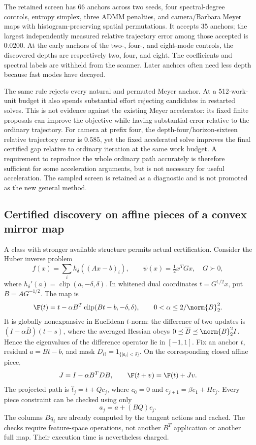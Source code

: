 The retained screen has 66 anchors across two seeds, four spectral-degree
controls, entropy simplex, three ADMM penalties, and camera/Barbara Meyer
maps with histogram-preserving spatial permutations. It accepts 35 anchors;
the largest independently measured relative trajectory error among those
accepted is $0.0200$. At the early anchors of the two-, four-, and eight-mode
controls, the discovered depths are respectively two, four, and eight.
The coefficients and spectral labels are withheld from the scanner.
Later anchors often need less depth because fast modes have decayed.

The same rule rejects every natural and permuted Meyer anchor. At a
512-work-unit budget it also spends substantial effort rejecting candidates
in restarted solves. This is not evidence against the existing Meyer
accelerator: its fixed finite proposals can improve the objective while
having substantial error relative to the ordinary trajectory. For camera
at prefix four, the depth-four/horizon-sixteen relative trajectory error is
$0.585$, yet the fixed accelerated solve improves the final certified gap
relative to ordinary iteration at the same work budget. A requirement to
reproduce the whole ordinary path accurately is therefore sufficient for
some acceleration arguments, but is not necessary for useful acceleration.
The sampled screen is retained as a diagnostic and is not promoted as the
new general method.

\subsection{Certified discovery on affine pieces of a convex mirror map}
A class with stronger available structure permits actual certification.
Consider the Huber inverse problem
\[
 f(x)=\sum_i h_\delta((Ax-b)_i),\qquad
 \psi(x)=\tfrac12 x^TGx,\quad G\succ0,
\]
where $h_\delta'(a)=\operatorname{clip}(a,-\delta,\delta)$.
In whitened dual coordinates $t=G^{1/2}x$, put $B=AG^{-1/2}$. The map is
\begin{equation}
 \F(t)=t-\alpha B^T\operatorname{clip}(Bt-b,-\delta,\delta),
 \qquad 0<\alpha\leq 2/\norm{B}_2^2. \label{eq:huber}
\end{equation}
It is globally nonexpansive in Euclidean $t$-norm: the difference of two
updates is $(I-\alpha\overline B)(t-s)$, where the averaged Hessian obeys
$0\preceq\overline B\preceq\norm{B}_2^2 I$. Hence the eigenvalues of the
difference operator lie in $[-1,1]$. Fix an anchor $t$, residual $a=Bt-b$, and mask
$D_{ii}=1_{\{|a_i|<\delta\}}$. On the corresponding closed affine piece,
\[
 J=I-\alpha B^TDB,\qquad
 \F(t+v)=\F(t)+Jv.
\]
The projected path is $\widehat t_j=t+Qc_j$, where
$c_0=0$ and $c_{j+1}=\beta e_1+Hc_j$.
Every piece constraint can be checked using only
\begin{equation}
 a_j=a+(BQ)c_j. \label{eq:featurepath}
\end{equation}
The columns $Bq_i$ are already computed by the tangent actions and cached.
The checks require feature-space operations, not another $B^T$ application
or another full map. Their execution time is nevertheless charged.

